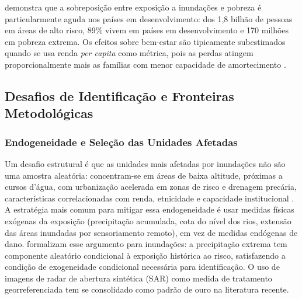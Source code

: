 \documentclass[a4paper,12pt]{article}
\begin{document}
 demonstra que a sobreposição entre exposição a inundações e
pobreza é particularmente aguda nos países em desenvolvimento: dos 1,8 bilhão de
pessoas em áreas de alto risco, 89\% vivem em países em desenvolvimento e 170 milhões
em pobreza extrema. Os efeitos sobre bem-estar são tipicamente subestimados quando se
usa renda \textit{per capita} como métrica, pois as perdas atingem proporcionalmente mais
as famílias com menor capacidade de amortecimento \cite{rentschler2022}.

\subsection{Desafios de Identificação e Fronteiras Metodológicas}
\label{sub:identificacao}

\subsubsection{Endogeneidade e Seleção das Unidades Afetadas}

Um desafio estrutural é que as unidades mais afetadas por inundações não são uma amostra
aleatória: concentram-se em áreas de baixa altitude, próximas a cursos d'água, com
urbanização acelerada em zonas de risco e drenagem precária, características
correlacionadas com renda, etnicidade e capacidade institucional
\cite{kahn2005death, rentschler2022}.
A estratégia mais
comum para mitigar essa endogeneidade é usar medidas físicas exógenas da exposição
(precipitação acumulada, cota do nível dos rios, extensão das áreas inundadas por
sensoriamento remoto), em vez de medidas endógenas de dano.
formalizam esse argumento para inundações: a precipitação extrema tem componente
aleatório condicional à exposição histórica ao risco, satisfazendo a condição de
exogeneidade condicional necessária para identificação. O uso de imagens de radar de
abertura sintética (SAR) como medida de tratamento georreferenciada tem se consolidado
como padrão de ouro na literatura recente.
\end{document}
